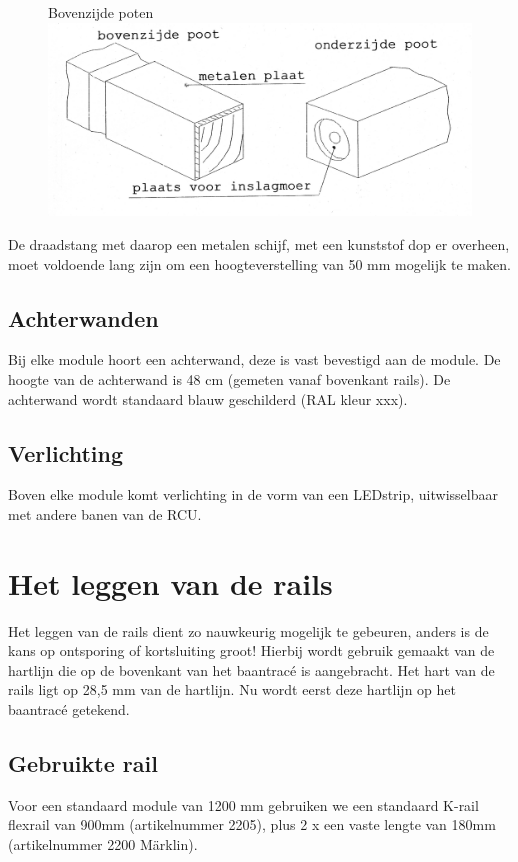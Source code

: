 \documentclass[12pt,a4paper]{report}
\newcommand*{\marklin}{M\"{a}rklin}
\newcommand*{\trace}{trac\'{e} }
\begin{document}
\begin{figure}[!ht]
  \captionbox
  {Bovenzijde poten\label{figuur3}}
  {\includegraphics[scale=0.2]{images/rcu_figuur3}}
\end{figure}

De draadstang met daarop een metalen schijf,  met een kunststof dop er overheen, moet voldoende lang zijn om een hoogteverstelling van 50 mm mogelijk te maken.

\section{Achterwanden}
\label{se:achterwanden}
Bij elke module hoort een achterwand, deze is vast bevestigd aan de module. De hoogte van de achterwand is 48 cm (gemeten vanaf bovenkant rails). De achterwand wordt standaard blauw geschilderd (RAL kleur xxx).

\section{Verlichting}
\label{se:verlichting}
Boven elke module komt verlichting in de vorm van een LEDstrip, uitwisselbaar met andere banen van de RCU.

\chapter{Het leggen van de rails}
\label{ch:rails}

Het leggen van de rails dient zo nauwkeurig mogelijk te gebeuren, anders is de kans op ontsporing of kortsluiting groot! Hierbij wordt gebruik gemaakt van de hartlijn die op de bovenkant van het baan\trace is aangebracht.
Het hart van de rails ligt op 28,5 mm van de hartlijn. Nu wordt eerst deze hartlijn op het baan\trace getekend.

\section{Gebruikte rail}
Voor een standaard module van 1200 mm gebruiken we een standaard K-rail flexrail van 900mm (artikelnummer 2205), plus 2 x een vaste lengte van 180mm (artikelnummer 2200 \marklin ).
\end{document}
